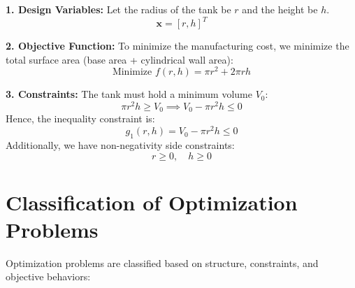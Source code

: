 \documentclass[12pt,a4paper]{article}
\begin{document}
\begin{tcolorbox}[examplebox, title={Cylindrical Tank Optimization Formulation}]
\textbf{1. Design Variables:}
Let the radius of the tank be $r$ and the height be $h$.
\begin{equation*}
  \mathbf{x} = [r, h]^T
\end{equation*}

\textbf{2. Objective Function:}
To minimize the manufacturing cost, we minimize the total surface area (base area + cylindrical wall area):
\begin{equation}
  \text{Minimize } f(r, h) = \pi r^2 + 2\pi r h
\end{equation}

\textbf{3. Constraints:}
The tank must hold a minimum volume $V_0$:
\begin{equation*}
  \pi r^2 h \ge V_0 \implies V_0 - \pi r^2 h \le 0
\end{equation*}
Hence, the inequality constraint is:
\begin{equation}
  g_1(r, h) = V_0 - \pi r^2 h \le 0
\end{equation}
Additionally, we have non-negativity side constraints:
\begin{equation}
  r \ge 0, \quad h \ge 0
\end{equation}
\end{tcolorbox}

\section{Classification of Optimization Problems}

Optimization problems are classified based on structure, constraints, and objective behaviors:
\end{document}
